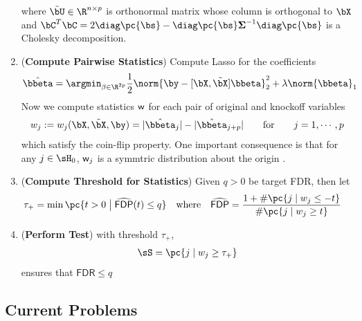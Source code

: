 \documentclass[11pt]{article}
\begin{document}
\begin{enumerate}
    where $\tilde{\bU}\in\R^{n\times p}$ is orthonormal matrix whose column is orthogonal to $\bX$ and $\bC^T\bC = 2\diag\pc{\bs} - \diag\pc{\bs}\bSigma^{-1}\diag\pc{\bs}$ is a Cholesky decomposition. 
    \item (\textbf{Compute Pairwise Statistics}) Compute Lasso for the coefficients
    \begin{align*}
        \hat{\bbeta}
            = \argmin_{\beta\in\R^{2p}}
                \frac{1}{2} \norm{\by - [\bX,\tilde{\bX}]\bbeta}_2^2 + \lambda \norm{\bbeta}_1
    \end{align*}
    Now we compute statistics $\mathsf{w}$ for each pair of original and knockoff variables
    \begin{align*}
        w_j
            := w_j(\bX,\tilde{\bX},\by)
            = |\hat{\bbeta}_j| - |\hat{\bbeta}_{j+p}|
        \quad\quad\text{for}\quad\quad
            j = 1,\cdots,p
    \end{align*}
    which satisfy the coin-flip property. One important consequence is that for any $j\in\sH_0$, $\mathsf{w}_j$ is a symmtric distribution about the origin \cite{barberControllingFalseDiscovery2015,candesPanningGoldModelX2017}.
    \item (\textbf{Compute Threshold for Statistics}) Given $q>0$ be target FDR, then let 
    \begin{align*}
        \tau_+
            &= \min\pc{t>0 \;\big|\; \widehat{\textsf{FDP}}(t) \leq q }
            \quad\text{where}\quad
            \widehat{\textsf{FDP}} = \frac{1 + \# \pc{ j \mid w_j \leq -t }}{\#\pc{j \mid w_j \geq t}} 
    \end{align*}
    \item (\textbf{Perform Test}) with threshold $\tau_+$,
    \begin{align*}
        \sS = 
            \pc{j \mid w_j \geq \tau_+}
    \end{align*}
    ensures that $\textsf{FDR}\leq q$
\end{enumerate} 

\subsection{Current Problems}
\end{document}
